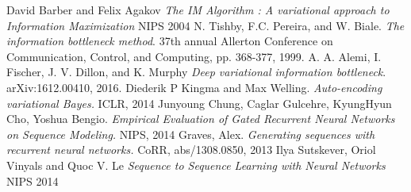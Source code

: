 \documentclass[10pt,oneside,openright]{report}
\begin{document}
\begin{thebibliography}{9} 
David Barber and Felix Agakov
\textit{The IM Algorithm : A variational approach to Information Maximization}
NIPS 2004
N. Tishby, F.C. Pereira, and W. Biale.
\textit{The information bottleneck method}.
37th annual Allerton Conference on Communication, Control, and Computing, pp. 368-377, 1999.
A. A. Alemi, I. Fischer, J. V. Dillon, and K. Murphy
\textit{Deep variational information bottleneck}.
 arXiv:1612.00410, 2016.
 Diederik P Kingma and Max Welling.
 \textit{Auto-encoding variational Bayes.}
  ICLR, 2014
 Junyoung Chung, Caglar Gulcehre, KyungHyun Cho, Yoshua Bengio.
 \textit{Empirical Evaluation of Gated Recurrent Neural Networks on Sequence Modeling.}
  NIPS, 2014
 Graves, Alex.
 \textit{Generating sequences with recurrent neural networks.}
 CoRR, abs/1308.0850, 2013
Ilya Sutskever, Oriol Vinyals and Quoc V. Le
\textit{Sequence to Sequence Learning with Neural Networks}
NIPS 2014

\end{thebibliography}
\end{document}
